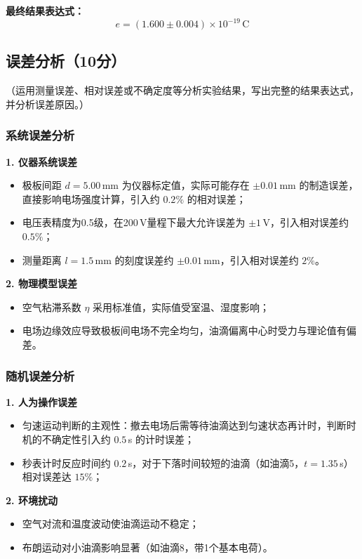 \documentclass{Phyport}
\begin{document}
\textbf{最终结果表达式：}
\begin{equation}
    \boxed{e = (1.600 \pm 0.004) \times 10^{-19}\,\mathrm{C}}
\end{equation}

\subsection{误差分析（10分）}
（运用测量误差、相对误差或不确定度等分析实验结果，写出完整的结果表达式，并分析误差原因。）

\subsubsection{系统误差分析}

\textbf{1. 仪器系统误差}
\begin{itemize}
    \item 极板间距 $d = 5.00$\,mm 为仪器标定值，实际可能存在 $\pm 0.01$\,mm 的制造误差，直接影响电场强度计算，引入约 $0.2\%$ 的相对误差；
    \item 电压表精度为0.5级，在200\,V量程下最大允许误差为 $\pm 1$\,V，引入相对误差约 $0.5\%$；
    \item 测量距离 $l = 1.5$\,mm 的刻度误差约 $\pm 0.01$\,mm，引入相对误差约 $2\%$。
\end{itemize}

\textbf{2. 物理模型误差}
\begin{itemize}
    \item 空气粘滞系数 $\eta$ 采用标准值，实际值受室温、湿度影响；
    \item 电场边缘效应导致极板间电场不完全均匀，油滴偏离中心时受力与理论值有偏差。
\end{itemize}

\subsubsection{随机误差分析}

\textbf{1. 人为操作误差}
\begin{itemize}
    \item 匀速运动判断的主观性：撤去电场后需等待油滴达到匀速状态再计时，判断时机的不确定性引入约 $0.5$\,s 的计时误差；
    \item 秒表计时反应时间约 $0.2$\,s，对于下落时间较短的油滴（如油滴5，$t = 1.35$\,s）相对误差达 $15\%$；
\end{itemize}

\textbf{2. 环境扰动}
\begin{itemize}
    \item 空气对流和温度波动使油滴运动不稳定；
    \item 布朗运动对小油滴影响显著（如油滴8，带1个基本电荷）。
\end{itemize}
\end{document}
